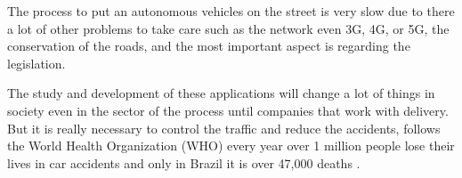 The process to put an autonomous vehicles on the street is very slow due to there a lot of other problems to take care such as the network even 3G, 4G, or 5G, the conservation of the roads, and the most important aspect is regarding the legislation. 

The study and development of these applications will change a lot of things in society even in the sector of the process until companies that work with delivery. But it is really necessary to control the traffic and reduce the accidents, follows the World Health Organization (WHO) every year over 1 million people lose their lives in car accidents and only in Brazil it is over 47,000 deaths \cite{world2004world}. 
